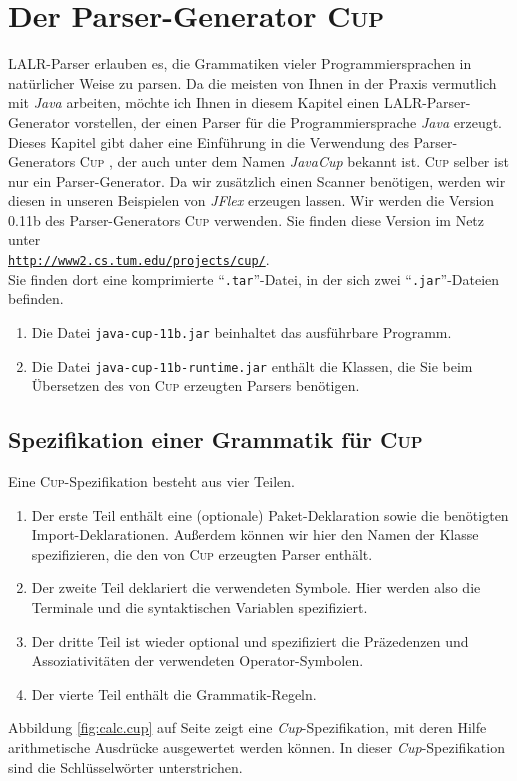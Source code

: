 \chapter{Der Parser-Generator \textsc{Cup} \label{chapter:cup}}
LALR-Parser erlauben es, die Grammatiken vieler Programmiersprachen in nat\"urlicher Weise
zu parsen.  Da die meisten von Ihnen in der Praxis vermutlich mit \textsl{Java} arbeiten, 
m\"ochte ich Ihnen in diesem Kapitel einen LALR-Parser-Generator vorstellen, der einen Parser f\"ur die
Programmiersprache \textsl{Java} erzeugt.  Dieses Kapitel gibt daher eine
Einf\"uhrung in die Verwendung des Parser-Generators \textsc{Cup} \cite{hudson:1999}, der auch
unter dem Namen \textsl{JavaCup} bekannt ist.
\textsc{Cup} selber ist nur ein Parser-Generator.  Da wir
zus\"atzlich einen Scanner ben\"otigen, werden wir diesen in unseren Beispielen von \textsl{JFlex}
erzeugen lassen.  Wir werden die Version 0.11b des Parser-Generators \textsc{Cup} 
verwenden.  Sie finden diese Version im Netz unter 
\\[0.2cm]
\hspace*{1.3cm}
\href{http://www2.cs.tum.edu/projects/cup/}{\texttt{http://www2.cs.tum.edu/projects/cup/}}.
\\[0.2cm]
Sie finden dort eine komprimierte ``\texttt{.tar}''-Datei, in der sich zwei
``\texttt{.jar}''-Dateien befinden.
\begin{enumerate}
\item Die Datei \texttt{java-cup-11b.jar} beinhaltet das ausf\"uhrbare Programm.
\item Die Datei \texttt{java-cup-11b-runtime.jar} enth\"alt die Klassen, die Sie beim \"Ubersetzen des
      von \textsc{Cup} erzeugten Parsers ben\"otigen.
\end{enumerate}

\section{Spezifikation einer Grammatik f\"ur  \textsc{Cup}}
Eine \textsc{Cup}-Spezifikation besteht aus vier Teilen.
\begin{enumerate}
\item Der erste Teil enth\"alt eine (optionale) Paket-Deklaration sowie die ben\"otigten
      Import-Deklarationen.  Au{\ss}erdem k\"onnen wir hier den Namen der Klasse spezifizieren, die den
      von \textsc{Cup} erzeugten Parser enth\"alt.
\item Der zweite Teil deklariert die verwendeten Symbole.  Hier werden also die Terminale
      und die syntaktischen Variablen spezifiziert.
\item Der dritte Teil ist wieder optional und spezifiziert die Pr\"azedenzen und Assoziativit\"aten 
      der verwendeten Operator-Symbolen.
\item Der vierte Teil enth\"alt die Grammatik-Regeln.
\end{enumerate}
Abbildung \ref{fig:calc.cup} auf Seite \pageref{fig:calc.cup} zeigt eine \textsl{Cup}-Spezifikation,
mit deren Hilfe arithmetische Ausdr\"ucke ausgewertet werden k\"onnen.  In dieser
\textsl{Cup}-Spezifikation sind die Schl\"usselw\"orter unterstrichen.

